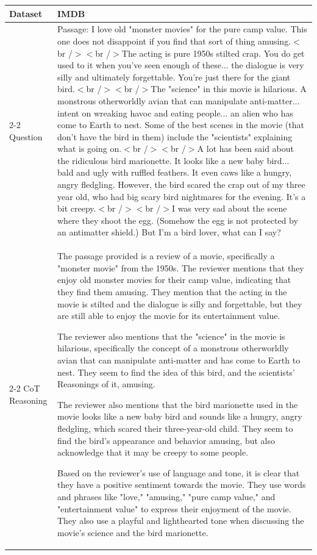 \begin{longtable} {p{3cm}p{13.85cm}}
Dataset & IMDB \\ \cline{2-2}
Question & Passage: I love old "monster movies" for the pure camp value. This one does not disappoint if you find that sort of thing amusing.$<$br /$>$$<$br /$>$The acting is pure 1950s stilted crap. You do get used to it when you've seen enough of these... the dialogue is very silly and ultimately forgettable. You're just there for the giant bird.$<$br /$>$$<$br /$>$The "science" in this movie is hilarious. A monstrous otherworldly avian that can manipulate anti-matter... intent on wreaking havoc and eating people... an alien who has come to Earth to nest. Some of the best scenes in the movie (that don't have the bird in them) include the "scientists" explaining what is going on.$<$br /$>$$<$br /$>$A lot has been said about the ridiculous bird marionette. It looks like a new baby bird... bald and ugly with ruffled feathers. It even caws like a hungry, angry fledgling. However, the bird scared the crap out of my three year old, who had big scary bird nightmares for the evening. It's a bit creepy.$<$br /$>$$<$br /$>$I was very sad about the scene where they shoot the egg. (Somehow the egg is not protected by an antimatter shield.) But I'm a bird lover, what can I say? \\ \cline{2-2}
CoT Reasoning & The passage provided is a review of a movie, specifically a "monster movie" from the 1950s. The reviewer mentions that they enjoy old monster movies for their camp value, indicating that they find them amusing. They mention that the acting in the movie is stilted and the dialogue is silly and forgettable, but they are still able to enjoy the movie for its entertainment value.

The reviewer also mentions that the "science" in the movie is hilarious, specifically the concept of a monstrous otherworldly avian that can manipulate anti-matter and has come to Earth to nest. They seem to find the idea of this bird, and the scientists' Reasonings of it, amusing.

The reviewer also mentions that the bird marionette used in the movie looks like a new baby bird and sounds like a hungry, angry fledgling, which scared their three-year-old child. They seem to find the bird's appearance and behavior amusing, but also acknowledge that it may be creepy to some people.

Based on the reviewer's use of language and tone, it is clear that they have a positive sentiment towards the movie. They use words and phrases like "love," "amusing," "pure camp value," and "entertainment value" to express their enjoyment of the movie. They also use a playful and lighthearted tone when discussing the movie's science and the bird marionette.


\end{longtable}
